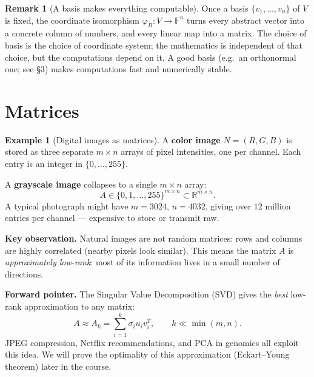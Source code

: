 \documentclass[11pt]{article}
\theoremstyle{definition}
\newtheorem{example}{Example}[section]
\newtheorem{remark}{Remark}[section]
\theoremstyle{plain}
\begin{document}
\begin{remark}[A basis makes everything computable]
  Once a basis $\{v_1,\ldots,v_n\}$ of $V$ is fixed, the coordinate
  isomorphism $\varphi_B: V\to\mathbb{F}^n$ turns every abstract vector
  into a concrete column of numbers, and every linear map into a matrix.
  The choice of basis is the choice of coordinate system; the mathematics
  is independent of that choice, but the computations depend on it.
  A good basis (e.g.\ an orthonormal one; see \S3) makes computations fast and
  numerically stable.
\end{remark}

\section{Matrices}

\begin{example}[Digital images as matrices]
  A \textbf{color image} $N = (R,G,B)$ is stored as three separate
  $m\times n$ arrays of pixel intensities, one per channel.  Each entry
  is an integer in $\{0,\ldots,255\}$.

  A \textbf{grayscale image} collapses to a single $m\times n$ array:
  \[
    A \in \{0,1,\ldots,255\}^{m\times n} \subset \mathbb{R}^{m\times n}.
  \]
  A typical photograph might have $m=3024$, $n=4032$, giving over
  $12$ million entries per channel --- expensive to store or transmit raw.

  \textbf{Key observation.} Natural images are not random matrices: rows
  and columns are highly correlated (nearby pixels look similar).  This
  means the matrix $A$ is \emph{approximately low-rank}: most of its
  information lives in a small number of directions.

  \textbf{Forward pointer.} The Singular Value Decomposition (SVD) gives
  the \emph{best} low-rank approximation to any matrix:
  \[
    A \approx A_k = \sum_{i=1}^k \sigma_i u_i v_i^T, \qquad k \ll \min(m,n).
  \]
  JPEG compression, Netflix recommendations, and PCA in genomics all
  exploit this idea.  We will prove the optimality of this approximation
  (Eckart--Young theorem) later in the course.
\end{example}
\end{document}

